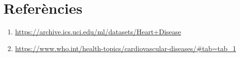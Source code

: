 \documentclass[12,]{article}
\providecommand{\tightlist}{%
  \setlength{\itemsep}{0pt}\setlength{\parskip}{0pt}}
\begin{document}
\hypertarget{referencies}{%
\section*{Referències}\label{referencies}}

\begin{enumerate}
\def\labelenumi{\arabic{enumi})}
\tightlist
\item
  \url{https://archive.ics.uci.edu/ml/datasets/Heart+Disease}
\item
  \url{https://www.who.int/health-topics/cardiovascular-diseases/\#tab=tab_1}
\end{enumerate}
\end{document}
